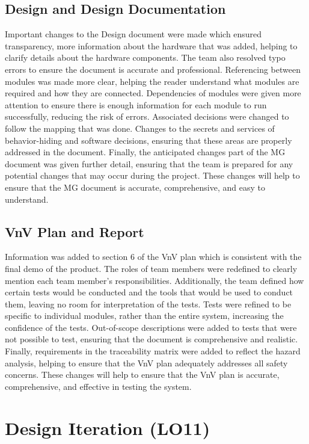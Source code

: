 \documentclass{article}
\begin{document}
\subsection{Design and Design Documentation}

Important changes to the Design document were made which ensured transparency, more information about the hardware that was added, helping to clarify details about the hardware components. The team also resolved typo errors to ensure the document is accurate and professional. Referencing between modules was made more clear, helping the reader understand what modules are required and how they are connected. Dependencies of modules were given more attention to ensure there is enough information for each module to run successfully, reducing the risk of errors. Associated decisions were changed to follow the mapping that was done. Changes to the secrets and services of behavior-hiding and software decisions, ensuring that these areas are properly addressed in the document. Finally, the anticipated changes part of the MG document was given further detail, ensuring that the team is prepared for any potential changes that may occur during the project. These changes will help to ensure that the MG document is accurate, comprehensive, and easy to understand.


\subsection{VnV Plan and Report}

Information was added to section 6 of the VnV plan which is consistent with the final demo of the product. The roles of team members were redefined to clearly mention each team member's responsibilities. Additionally, the team defined how certain tests would be conducted and the tools that would be used to conduct them, leaving no room for interpretation of the tests. Tests were refined to be specific to individual modules, rather than the entire system, increasing the confidence of the tests. Out-of-scope descriptions were added to tests that were not possible to test, ensuring that the document is comprehensive and realistic. Finally, requirements in the traceability matrix were added to reflect the hazard analysis, helping to ensure that the VnV plan adequately addresses all safety concerns. These changes will help to ensure that the VnV plan is accurate, comprehensive, and effective in testing the system.


\section{Design Iteration (LO11)}
\end{document}
